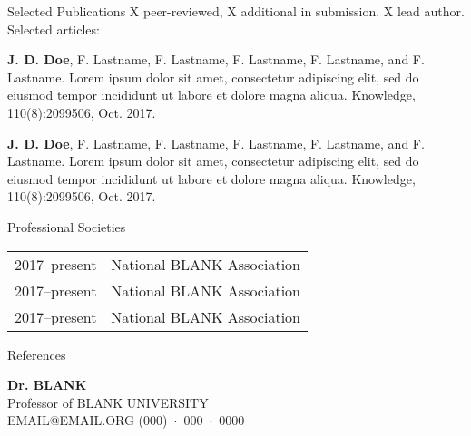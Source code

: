 \documentclass{resume} %
\newlength{\pcolleftwdth} %
\begin{document}
\ifresume
    \begin{rSection}{Selected Publications}
    \vspace{-0.3em} X peer-reviewed, X additional in submission. X lead author. Selected articles:
    
    \begin{minipage}[t]{\linewidth}
        \begin{hangparas}{0.8em}{1}
        
        \textbf{J. D. Doe}, F. Lastname, F. Lastname, F. Lastname, F. Lastname, and F. Lastname. Lorem ipsum dolor sit amet, consectetur adipiscing elit, sed do eiusmod tempor incididunt ut labore et dolore magna aliqua. Knowledge, 110(8):2099506, Oct. 2017.\smallskip
        
        \textbf{J. D. Doe}, F. Lastname, F. Lastname, F. Lastname, F. Lastname, and F. Lastname. Lorem ipsum dolor sit amet, consectetur adipiscing elit, sed do eiusmod tempor incididunt ut labore et dolore magna aliqua. Knowledge, 110(8):2099506, Oct. 2017.\smallskip
        
        \end{hangparas}
    
    \end{minipage}\par
    \end{rSection}
\fi

\ifresume
\else
    \begin{rSection}{Professional Societies}
    
    \begin{tabular}{@{}
        p{\pcolleftwdth}
        p{\pcolwdth}}
        {2017--present}&{National BLANK Association}\\
        {2017--present}&{National BLANK Association}\\
        {2017--present}&{National BLANK Association}\\
    \end{tabular}\par

    \end{rSection}
\fi


\ifresume
\else
    \begin{rSection}{References}

    {\bf Dr. BLANK}\\
    Professor of BLANK \hfill UNIVERSITY\\
    EMAIL@EMAIL.ORG \hfill (000)~$\cdot$~000~$\cdot$~0000

    \end{rSection}
\fi
\end{document}
